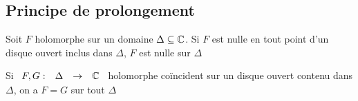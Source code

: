 \documentclass[]{report}
\begin{document}
\subsection{Principe de prolongement}

\begin{lm}
    Soit $F$ holomorphe sur un domaine $\Delta\subseteq\mathbb{C}$. Si $F$ est nulle en tout point d'un disque ouvert inclus dans $\Delta$, $F$ est nulle sur $\Delta$
\end{lm}

\begin{prop}
    Si $\begin{array}{ccccc} F,G : & \Delta & \to & \mathbb{C} \end{array}$ holomorphe coïncident sur un disque ouvert contenu dans $\Delta$, on a $F=G$ sur tout $\Delta$
\end{prop}
\end{document}
